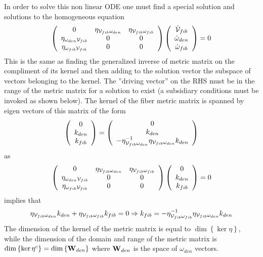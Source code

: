 In order to solve this non linear ODE one must find a special solution and
solutions to the homogeneous equation 
\begin{equation}
\left( 
\begin{array}{ccc}
0 & \eta _{{\cal V}_{fib}\omega _{den}} & \eta _{{\cal V}_{fib}\omega _{fib}}
\\ 
\eta _{\omega _{den}{\cal V}_{fib}} & 0 & 0 \\ 
\eta _{\omega _{fib}{\cal V}_{fib}} & 0 & 0%
\end{array}%
\right) \left( 
\begin{array}{c}
{\cal \dot{V}}_{fib} \\ 
\dot{\omega}_{den} \\ 
\dot{\omega}_{fib}%
\end{array}%
\right) =0
\end{equation}%
This is the same as finding the generalized inverse of metric matrix on the
compliment of its kernel and then adding to the solution vector the subspace
of vectors belonging to the kernel. The ''driving vector'' on the RHS must
be in the range of the metric matrix for a solution to exist (a subsidiary
conditions must be invoked as shown below). The kernel of the fiber metric
matrix is spanned by eigen vectors of this matrix of the form%
\begin{equation}
\left( 
\begin{array}{c}
0 \\ 
k_{den} \\ 
k_{fib}%
\end{array}%
\right) =\left( 
\begin{array}{c}
0 \\ 
k_{den} \\ 
-\eta _{{\cal V}_{fib}\omega _{den}}^{-1}\eta _{{\cal V}_{fib}\omega
_{den}}k_{den}%
\end{array}%
\right)
\end{equation}%
as 
\begin{equation}
\left( 
\begin{array}{ccc}
0 & \eta _{{\cal V}_{fib}\omega _{den}} & \eta _{{\cal V}_{fib}\omega _{fib}}
\\ 
\eta _{\omega _{den}{\cal V}_{fib}} & 0 & 0 \\ 
\eta _{\omega _{fib}{\cal V}_{fib}} & 0 & 0%
\end{array}%
\right) \left( 
\begin{array}{c}
0 \\ 
k_{den} \\ 
k_{fib}%
\end{array}%
\right) =0
\end{equation}%
implies that 
\begin{equation}
\eta _{{\cal V}_{fib}\omega _{den}}k_{den}+\eta _{{\cal V}_{fib}\omega
_{fib}}k_{fib}=0\Rightarrow k_{fib}=-\eta _{{\cal V}_{fib}\omega
_{fib}}^{-1}\eta _{{\cal V}_{fib}\omega _{den}}k_{den}
\end{equation}%
The dimension of the kernel of the metric matrix is equal to $\dim \left\{
\ker \eta \right\} $, while the dimension of the domain and range of the
metric matrix is $\dim \left\{ \ker \eta ^{c}\right\} =\dim \left\{ {\bf W}%
_{den}\right\} $ where ${\bf W}_{den}$ is the space of $\omega _{den}$
vectors.

